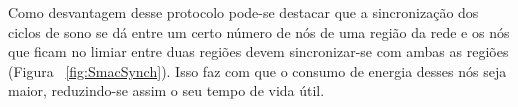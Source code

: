 Como desvantagem desse protocolo pode-se destacar que a sincronização dos ciclos de sono se dá entre um certo número de nós de uma região da rede e os nós que ficam no limiar entre duas regiões devem sincronizar-se com ambas as regiões (Figura ~\ref{fig:SmacSynch}). Isso faz com que o consumo de energia desses nós seja maior, reduzindo-se assim o seu tempo de vida útil.
 

 
 
 



% 

 
